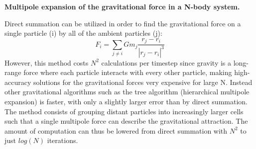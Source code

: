 \centerline{\textbf{Multipole expansion of the gravitational force in a N-body system.}} 
Direct summation can be utilized in order to find the gravitational force on a single particle (i) by all of the ambient particles (j):
\begin{equation}
F_i = \sum\limits_{j \neq i} Gm_j\frac{r_j - r_i}{|r_j - r_i|^3} 
\end{equation}
However, this method costs $N^2$ calculations per timestep since gravity is a long-range force where each particle interacts with every other particle, making high-accuracy solutions for the gravitational forces very expensive for large N. Instead other gravitational algorithms such as the tree algorithm (hierarchical multipole expansion) is faster, with only a slightly larger error than by direct summation. The method consists of grouping distant particles into increasingly larger cells such that a single multipole force can describe the gravitational attraction. The amount of computation can thus be lowered from direct summation with $N^2$ to just $log(N)$ iterations. \\ 

